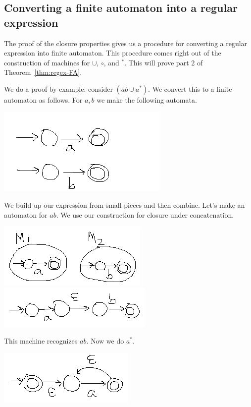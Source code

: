 \subsection{Converting a finite automaton into a regular expression}
The proof of the closure properties gives us a procedure for converting a regular expression into finite automaton. This procedure comes right out of the construction of machines for $\cup$, $\circ$, and ${}^*$. This will prove part 2 of Theorem~\ref{thm:regex-FA}.

We do a proof by example: consider $(ab\cup a^*)$. We convert this to a finite automaton as follows. %
For $a,b$ we make the following automata. 

\begin{center}
\includegraphics[scale=0.5]{2-8}
\end{center} 

We build up our expression from small pieces and then combine. Let's make an automaton for $ab$. We use our construction for closure under concatenation.

\begin{center}
\includegraphics{2-9}\\

\includegraphics{2-10a}
\end{center} 

This machine recognizes $ab$. Now we do $a^*$.

\begin{center}
\includegraphics{2-10b}
\end{center} 

